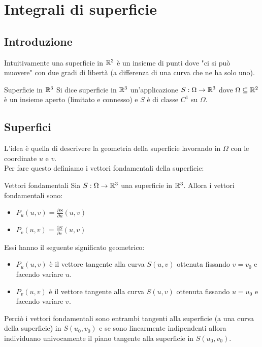 \chapter{Integrali di superficie}

\section{Introduzione}
Intuitivamente una superficie in $\mathbb{R}^3$ è un insieme di punti dove "ci si può muovere" con due gradi di libertà (a differenza di una curva che ne ha solo uno).

\begin{definizione}{Superficie in $\mathbb{R}^3$}
  Si dice superficie in $\mathbb{R}^3$ un'applicazione $S:\Omega\to\mathbb{R}^3$ dove $\Omega\subseteq\mathbb{R}^2$ è un insieme aperto (limitato e connesso) e $S$ è di classe $C^1$ su $\Omega$.
\end{definizione}

\section{Superfici}
L'idea è quella di descrivere la geometria della superficie lavorando in $\Omega$ con le coordinate $u$ e $v$.\\
Per fare questo definiamo i vettori fondamentali della superficie:
\begin{definizione}{Vettori fondamentali}
  Sia $S:\Omega\to\mathbb{R}^3$ una superficie in $\mathbb{R}^3$. Allora i vettori fondamentali sono:
  \begin{itemize}
    \item $P_u(u,v)=\frac{\partial S}{\partial u}(u,v)$
    \item $P_v(u,v)=\frac{\partial S}{\partial v}(u,v)$
  \end{itemize}
\end{definizione}
Essi hanno il seguente significato geometrico:
\begin{itemize}
  \item $P_u(u,v)$ è il vettore tangente alla curva $S(u,v)$ ottenuta fissando $v=v_0$ e facendo variare $u$.
  \item $P_v(u,v)$ è il vettore tangente alla curva $S(u,v)$ ottenuta fissando $u=u_0$ e facendo variare $v$.
\end{itemize}
Perciò i vettori fondamentali sono entrambi tangenti alla superficie (a una curva della superficie) in $S(u_0,v_0)$ e se sono linearmente indipendenti allora individuano univocamente il piano tangente alla superficie in $S(u_0,v_0)$.

